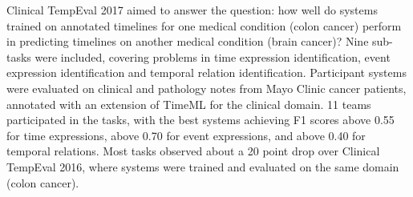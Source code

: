 Clinical TempEval 2017 aimed to answer the question: how well do systems trained on annotated timelines for one medical condition (colon cancer) perform in predicting timelines on another medical condition (brain cancer)? Nine sub-tasks were included, covering problems in time expression identification, event expression identification and temporal relation identification. Participant systems were evaluated on clinical and pathology notes from Mayo Clinic cancer patients, annotated with an extension of TimeML for the clinical domain. 11 teams participated in the tasks, with the best systems achieving F1 scores above 0.55 for time expressions, above 0.70 for event expressions, and above 0.40 for temporal relations. Most tasks observed about a 20 point drop over Clinical TempEval 2016, where systems were trained and evaluated on the same domain (colon cancer).
